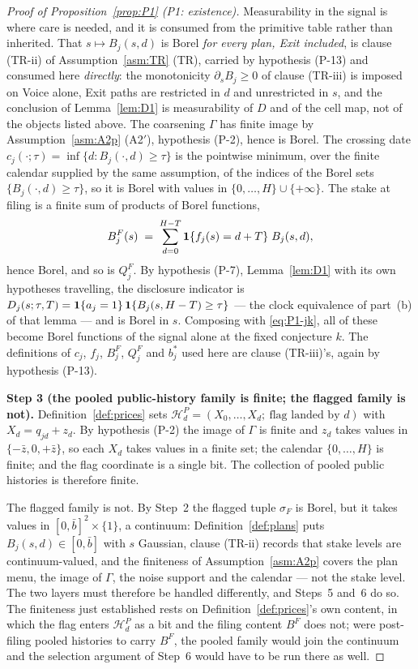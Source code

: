 \begin{proof}[Proof of Proposition~\ref{prop:P1} (P1: existence)]
Measurability in the signal is where care is needed, and it is consumed from the primitive table
rather than inherited. That $s \mapsto B_j(s,d)$ is Borel \emph{for every plan, Exit included}, is
clause (TR-ii) of Assumption~\ref{asm:TR} (TR), carried by hypothesis (P-13) and consumed here
\emph{directly}: the monotonicity $\partial_s B_j \ge 0$ of clause (TR-iii) is imposed on Voice
alone, Exit paths are restricted in $d$ and unrestricted in $s$, and the conclusion of
Lemma~\ref{lem:D1} is measurability of $D$ and of the cell map, not of the objects listed above. The
coarsening $\Gamma$ has finite image by Assumption~\ref{asm:A2p} (A2$'$), hypothesis (P-2), hence is Borel.
The crossing date $c_j(\cdot;\tau) = \inf\{d : B_j(\cdot,d) \ge \tau\}$ is the pointwise minimum,
over the finite calendar supplied by the same assumption, of the indices of the Borel sets
$\{B_j(\cdot,d) \ge \tau\}$, so it is Borel with values in $\{0,\dots,H\} \cup \{+\infty\}$. The
stake at filing is a finite sum of products of Borel functions,
\begin{equation}
\label{eq:P1-BF}
B_j^F(s) \;=\; \sum_{d=0}^{H-T} \mathbf{1}\{f_j(s) = d+T\}\; B_j(s,d),
\end{equation}
hence Borel, and so is $Q_j^F$. By hypothesis (P-7), Lemma~\ref{lem:D1} with its own hypotheses
travelling, the disclosure indicator is $D_j(s;\tau,T) = \mathbf{1}\{a_j = 1\}\,\mathbf{1}\{B_j(s,H-T) \ge
\tau\}$ --- the clock equivalence of part~(b) of that lemma --- and is Borel in $s$. Composing with
\eqref{eq:P1-jk}, all of these become Borel functions of the signal alone at the fixed conjecture
$k$. The definitions of $c_j$, $f_j$, $B_j^F$, $Q_j^F$ and $b_j^*$ used here are clause (TR-iii)'s,
again by hypothesis (P-13).

\smallskip
\noindent\textbf{Step 3 (the pooled public-history family is finite; the flagged family is not).}
Definition~\ref{def:prices} sets $\mathcal H_d^P = (X_0,\dots,X_d;\ \text{flag landed by } d)$ with
$X_d = q_{jd}+z_d$. By hypothesis (P-2) the image of $\Gamma$ is finite and $z_d$ takes values in
$\{-\bar z,0,+\bar z\}$, so each $X_d$ takes values in a finite set; the calendar
$\{0,\dots,H\}$ is finite; and the flag coordinate is a single bit. The collection of pooled public
histories is therefore finite.

The flagged family is not. By Step~2 the flagged tuple $\sigma_F$ is Borel, but it takes values in
$[0,\bar b]^2 \times \{1\}$, a continuum: Definition~\ref{def:plans} puts $B_j(s,d) \in [0,\bar b]$
with $s$ Gaussian, clause (TR-ii) records that stake levels are continuum-valued, and the finiteness
of Assumption~\ref{asm:A2p} covers the plan menu, the image of $\Gamma$, the noise support and the
calendar --- not the stake level. The two layers must therefore be handled differently, and Steps~5
and~6 do so. The finiteness just established rests on Definition~\ref{def:prices}'s own content, in
which the flag enters $\mathcal H_d^P$ as a bit and the filing content $B^F$ does not; were
post-filing pooled histories to carry $B^F$, the pooled family would join the continuum and the
selection argument of Step~6 would have to be run there as well.


\end{proof}
